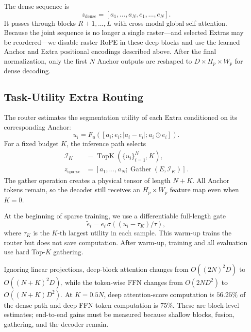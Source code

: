 \documentclass[10pt,twocolumn,letterpaper]{article}
\newcommand{\TopK}{\operatorname{TopK}}
\begin{document}
The dense sequence is
\begin{equation}
z_{\mathrm{dense}}=[a_1,\ldots,a_N,e_1,\ldots,e_N].
\end{equation}
It passes through blocks $R+1,\ldots,L$ with cross-modal global self-attention.
Because the joint sequence is no longer a single raster---and selected Extras may be reordered---we disable raster RoPE in these deep blocks and use the learned Anchor and Extra positional encodings described above.
After the final normalization, only the first $N$ Anchor outputs are reshaped to $D\times H_p\times W_p$ for dense decoding.

\subsection{Task-Utility Extra Routing}
\label{sec:routing}

The router estimates the segmentation utility of each Extra conditioned on its corresponding Anchor:
\begin{equation}
u_i=F_u([a_i;e_i;|a_i-e_i|;a_i\odot e_i]).
\end{equation}
For a fixed budget $K$, the inference path selects
\begin{align}
\mathcal I_K &= \TopK(\{u_i\}_{i=1}^N,K),\\
z_{\mathrm{sparse}} &= [a_1,\ldots,a_N;\operatorname{Gather}(E,\mathcal I_K)].
\end{align}
The gather operation creates a physical tensor of length $N+K$.
All Anchor tokens remain, so the decoder still receives an $H_p\times W_p$ feature map even when $K=0$.

At the beginning of sparse training, we use a differentiable full-length gate
\begin{equation}
\tilde e_i=e_i\,\sigma((u_i-\tau_K)/\tau),
\end{equation}
where $\tau_K$ is the $K$-th largest utility in each sample.
This warm-up trains the router but does not save computation.
After warm-up, training and all evaluation use hard Top-$K$ gathering.

Ignoring linear projections, deep-block attention changes from $O((2N)^2D)$ to $O((N+K)^2D)$, while the token-wise FFN changes from $O(2ND^2)$ to $O((N+K)D^2)$.
At $K=0.5N$, deep attention-score computation is $56.25\%$ of the dense path and deep FFN token computation is $75\%$.
These are block-level estimates; end-to-end gains must be measured because shallow blocks, fusion, gathering, and the decoder remain.
\end{document}
